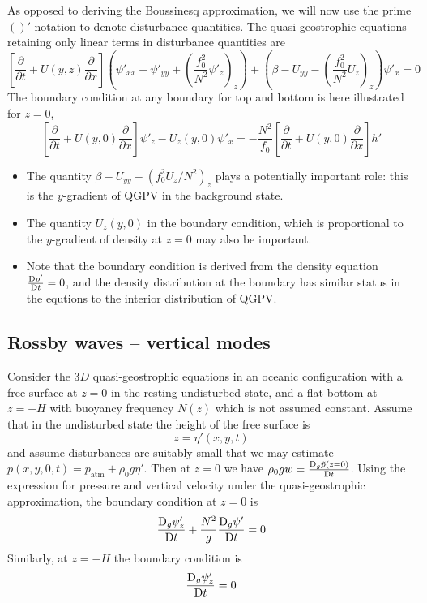 \documentclass{jknotes}
\begin{document}
As opposed to deriving the Boussinesq approximation, we will now use the prime
$()'$ notation to denote disturbance quantities. The quasi-geostrophic
equations retaining only linear terms in disturbance quantities are
\begin{equation}
	\left[ \frac{\partial}{\partial t} + U(y,z) \frac{\partial}{\partial
	x}\right](\psi'_{xx} + \psi'_{yy} + (\frac{f_0^2}{N^2} \psi'_z)_z) +
	(\beta - U_{yy} - (\frac{f_0^2}{N^2} U_z)_z)\psi'_x = 0 \label{eq:QGPVlin}
\end{equation}
The boundary condition at any boundary for top and bottom is here  illustrated
for $z=0$,
\begin{equation}
	\left[\frac{\partial}{\partial t} + U(y,0) \frac{\partial}{\partial
		x}\right] \psi'_z - U_z(y,0) \psi'_x = -\frac{N^2}{f_0} \left[
			\frac{\partial}{\partial t} + U(y,0) \frac{\partial}{\partial x}
		\right] h'
\end{equation}

\begin{itemize}
	\item The quantity $\beta - U_{yy} - (f_0^2 U_z / N^2)_z$ plays a
		potentially important role: this is the $y$-gradient of QGPV in the
		background state.
	\item The quantity $U_z(y,0)$ in the boundary condition, which is
		proportional to the $y$-gradient of density at $z=0$ may also be
		important.
	\item Note that the boundary condition is derived from the density
		equation $\frac{\mathrm{D} \rho'}{\mathrm{D} t} = 0$, and the density
		distribution at the boundary has similar status in the equtions to the
		interior distribution of QGPV.
\end{itemize}

\subsection{Rossby waves -- vertical modes}
Consider the $3D$ quasi-geostrophic equations in an oceanic configuration with
a free surface at $z=0$ in the resting undisturbed state, and a flat bottom at
$z = -H$ with buoyancy frequency $N(z)$ which is not assumed constant. Assume
that in the undisturbed state the height of the free surface is
\begin{equation}
	z = \eta'(x,y,t)
\end{equation}
and assume disturbances are suitably small that we may estimate $p(x,y,0,t) =
p_{\text{atm}} + \rho_0 g \eta'$. Then at $z=0$ we have $\rho_0 g w =
\frac{\mathrm{D}_g \tilde{p}(z=0)}{\mathrm{D} t}$. Using the expression for pressure
and vertical velocity under the quasi-geostrophic approximation, the boundary
condition at $z=0$ is
\begin{equation}
	\frac{\mathrm{D}_g \psi'_z}{\mathrm{D} t} + \frac{N^2}{g} \frac{\mathrm{D}_g
	\psi'}{\mathrm{D} t} = 0
\end{equation}
Similarly, at $z=-H$ the boundary condition is
\begin{equation}
	\frac{\mathrm{D}_g \psi'_z}{\mathrm{D} t} = 0 
\end{equation}
\end{document}
